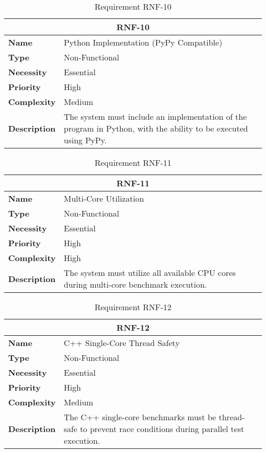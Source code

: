 \begin{table}[H]
    \centering
    \begin{tabular}{l p{10cm}}
        \toprule
        \multicolumn{2}{c}{\textbf{RNF-10}} \\
        \toprule
        \textbf{Name}         & Python Implementation (PyPy Compatible) \\
        \textbf{Type}         & Non-Functional \\
        \textbf{Necessity}    & Essential \\
        \textbf{Priority}     & High \\
        \textbf{Complexity}   & Medium \\
        \textbf{Description}  & The system must include an implementation of the program in Python, with the ability to be executed using PyPy. \\
        \bottomrule
    \end{tabular}
\caption{Requirement RNF-10}\label{tab:rnf-10}
\end{table}


\begin{table}[H]
    \centering
    \begin{tabular}{l p{10cm}}
        \toprule
        \multicolumn{2}{c}{\textbf{RNF-11}} \\
        \toprule
        \textbf{Name}         & Multi-Core Utilization \\
        \textbf{Type}         & Non-Functional \\
        \textbf{Necessity}    & Essential \\
        \textbf{Priority}     & High \\
        \textbf{Complexity}   & High \\
        \textbf{Description}  & The system must utilize all available CPU cores during multi-core benchmark execution. \\
        \bottomrule
    \end{tabular}
\caption{Requirement RNF-11}\label{tab:rnf-11}
\end{table}

\begin{table}[H]
    \centering
    \begin{tabular}{l p{10cm}}
        \toprule
        \multicolumn{2}{c}{\textbf{RNF-12}} \\
        \toprule
        \textbf{Name}         & C++ Single-Core Thread Safety \\
        \textbf{Type}         & Non-Functional \\
        \textbf{Necessity}    & Essential \\
        \textbf{Priority}     & High \\
        \textbf{Complexity}   & Medium \\
        \textbf{Description}  & The C++ single-core benchmarks must be thread-safe to prevent race conditions during parallel test execution. \\
        \bottomrule
    \end{tabular}
\caption{Requirement RNF-12}\label{tab:rnf-12}
\end{table}

